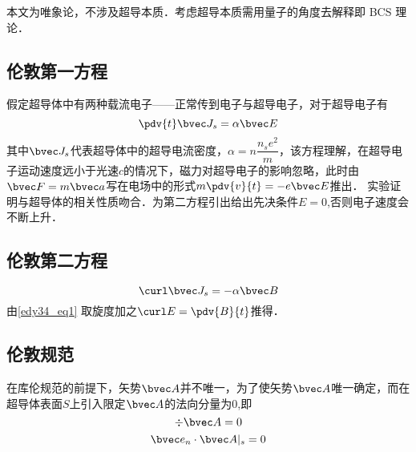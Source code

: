 

本文为唯象论，不涉及超导本质．考虑超导本质需用量子的角度去解释即 BCS 理论．
\subsection{伦敦第一方程}
假定超导体中有两种载流电子——正常传到电子与超导电子，对于超导电子有
\begin{equation}
\pdv{t}\bvec J_s=\alpha\bvec E \label{edy34_eq1}
\end{equation}
其中$\bvec J_s$代表超导体中的超导电流密度，$\alpha=n\dfrac {n_se^2}m$，该方程理解，在超导电子运动速度远小于光速$c$的情况下，磁力对超导电子的影响忽略，此时由$\bvec F=m \bvec a$写在电场中的形式$m\pdv{v}{t}=-e\bvec E$推出．
实验证明与超导体的相关性质吻合．为第二方程引出给出先决条件$E=0$,否则电子速度会不断上升．
\subsection{伦敦第二方程}
\begin{equation}
\curl\bvec J_s=-\alpha\bvec B \label{edy34_eq2}
\end{equation}
由\autoref{edy34_eq1} 取旋度加之$\curl E=\pdv{B}{t}$推得．
\subsection{伦敦规范}
在库伦规范的前提下，矢势$\bvec A$并不唯一，为了使矢势$\bvec A$唯一确定，而在超导体表面$S$上引入限定$\bvec A$的法向分量为$0$,即
\begin{equation}
\div \bvec A=0
\end{equation}
\begin{equation}
\bvec e_n \cdot \bvec A|_s=0
\end{equation}
